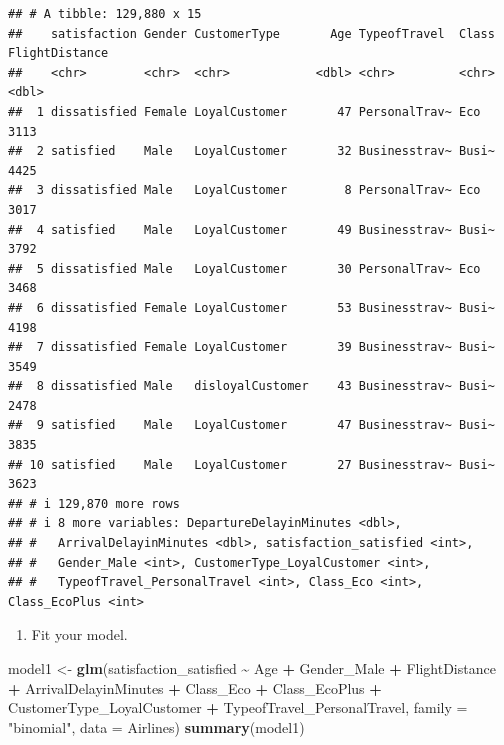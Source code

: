 \documentclass[
]{article}
\newenvironment{Shaded}{\begin{snugshade}}{\end{snugshade}}
\newcommand{\AttributeTok}[1]{\textcolor[rgb]{0.13,0.29,0.53}{#1}}
\newcommand{\FunctionTok}[1]{\textcolor[rgb]{0.13,0.29,0.53}{\textbf{#1}}}
\newcommand{\NormalTok}[1]{#1}
\newcommand{\OtherTok}[1]{\textcolor[rgb]{0.56,0.35,0.01}{#1}}
\newcommand{\SpecialCharTok}[1]{\textcolor[rgb]{0.81,0.36,0.00}{\textbf{#1}}}
\newcommand{\StringTok}[1]{\textcolor[rgb]{0.31,0.60,0.02}{#1}}
\providecommand{\tightlist}{%
  \setlength{\itemsep}{0pt}\setlength{\parskip}{0pt}}
\begin{document}
\begin{verbatim}
## # A tibble: 129,880 x 15
##    satisfaction Gender CustomerType       Age TypeofTravel  Class FlightDistance
##    <chr>        <chr>  <chr>            <dbl> <chr>         <chr>          <dbl>
##  1 dissatisfied Female LoyalCustomer       47 PersonalTrav~ Eco             3113
##  2 satisfied    Male   LoyalCustomer       32 Businesstrav~ Busi~           4425
##  3 dissatisfied Male   LoyalCustomer        8 PersonalTrav~ Eco             3017
##  4 satisfied    Male   LoyalCustomer       49 Businesstrav~ Busi~           3792
##  5 dissatisfied Male   LoyalCustomer       30 PersonalTrav~ Eco             3468
##  6 dissatisfied Female LoyalCustomer       53 Businesstrav~ Busi~           4198
##  7 dissatisfied Female LoyalCustomer       39 Businesstrav~ Busi~           3549
##  8 dissatisfied Male   disloyalCustomer    43 Businesstrav~ Busi~           2478
##  9 satisfied    Male   LoyalCustomer       47 Businesstrav~ Busi~           3835
## 10 satisfied    Male   LoyalCustomer       27 Businesstrav~ Busi~           3623
## # i 129,870 more rows
## # i 8 more variables: DepartureDelayinMinutes <dbl>,
## #   ArrivalDelayinMinutes <dbl>, satisfaction_satisfied <int>,
## #   Gender_Male <int>, CustomerType_LoyalCustomer <int>,
## #   TypeofTravel_PersonalTravel <int>, Class_Eco <int>, Class_EcoPlus <int>
\end{verbatim}

\newpage

\begin{enumerate}
\def\labelenumi{\arabic{enumi}.}
\tightlist
\item
  Fit your model.
\end{enumerate}

\begin{Shaded}
\begin{Highlighting}[]
\NormalTok{model1 }\OtherTok{\textless{}{-}} \FunctionTok{glm}\NormalTok{(satisfaction\_satisfied }\SpecialCharTok{\textasciitilde{}}\NormalTok{ Age }\SpecialCharTok{+}\NormalTok{ Gender\_Male }\SpecialCharTok{+}\NormalTok{ FlightDistance }\SpecialCharTok{+}\NormalTok{ ArrivalDelayinMinutes }\SpecialCharTok{+}\NormalTok{ Class\_Eco }\SpecialCharTok{+}\NormalTok{ Class\_EcoPlus }\SpecialCharTok{+}\NormalTok{ CustomerType\_LoyalCustomer }\SpecialCharTok{+}\NormalTok{ TypeofTravel\_PersonalTravel, }\AttributeTok{family =} \StringTok{"binomial"}\NormalTok{, }\AttributeTok{data =}\NormalTok{ Airlines)}
\FunctionTok{summary}\NormalTok{(model1)}
\end{Highlighting}
\end{Shaded}
\end{document}
